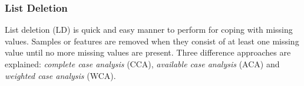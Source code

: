 \documentclass[10pt,a4paper]{article}
\begin{document}
	
	
	
	\subsubsection{List Deletion}
	\label{subsec:ListDeletion}
	
	List deletion (LD) is quick and easy manner to perform for coping with missing values. Samples or features are removed when they consist of at least one missing value until no more missing values are present. Three difference approaches are explained: \textit{complete case analysis} (CCA), \textit{available case analysis} (ACA) and \textit{weighted case analysis} (WCA).
	
\end{document}
